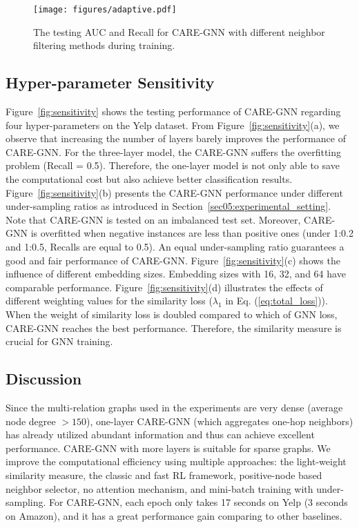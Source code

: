 \begin{figure}
     \centering
         \texttt{[image: figures/adaptive.pdf]}
         \caption{The testing AUC and Recall for CARE-GNN with different neighbor filtering methods during training.}
        \label{fig:adaptive}
\end{figure}



\subsection{Hyper-parameter Sensitivity}
\label{sec05:sensitivity}


Figure~\ref{fig:sensitivity} shows the testing performance of CARE-GNN regarding four hyper-parameters on the Yelp dataset.
From Figure~\ref{fig:sensitivity}(a), we observe that increasing the number of layers barely improves the performance of CARE-GNN.
For the three-layer model, the CARE-GNN suffers the overfitting problem (Recall = 0.5).
Therefore, the one-layer model is not only able to save the computational cost but also achieve better classification results.
Figure~\ref{fig:sensitivity}(b) presents the CARE-GNN performance under different under-sampling ratios as introduced in Section~\ref{sec05:experimental_setting}.
Note that CARE-GNN is tested on an imbalanced test set.
Moreover, CARE-GNN is overfitted when negative instances are less than positive ones (under 1:0.2 and 1:0.5, Recalls are equal to 0.5).
An equal under-sampling ratio guarantees a good and fair performance of CARE-GNN.
Figure~\ref{fig:sensitivity}(c) shows the influence of different embedding sizes. Embedding sizes with 16, 32, and 64 have comparable performance.
Figure~\ref{fig:sensitivity}(d) illustrates the effects of different weighting values for the similarity loss ($\lambda_1$ in Eq. (\ref{eq:total_loss})).
When the weight of similarity loss is doubled compared to which of GNN loss, CARE-GNN reaches the best performance.
Therefore, the similarity measure is crucial for GNN training.


\subsection{Discussion}
\label{sec05:discussion}

Since the multi-relation graphs used in the experiments are very dense (average node degree $>150$), one-layer CARE-GNN (which aggregates one-hop neighbors) has already utilized abundant information and thus can achieve excellent performance.
CARE-GNN with more layers is suitable for sparse graphs.
We improve the computational efficiency using multiple approaches: the light-weight similarity measure, the classic and fast RL framework, positive-node based neighbor selector, no attention mechanism, and mini-batch training with under-sampling.
For CARE-GNN, each epoch only takes 17 seconds on Yelp (3 seconds on Amazon), and it has a great performance gain comparing to other baselines.
